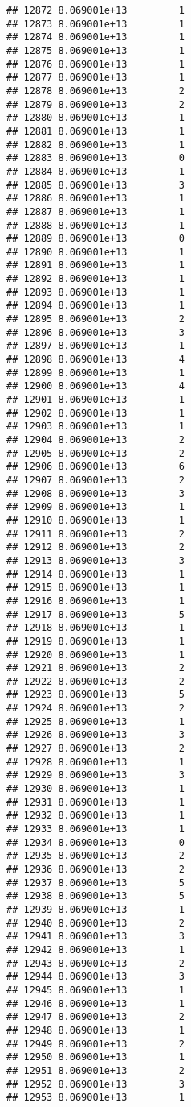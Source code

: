 \documentclass[
]{article}
\begin{document}
\begin{verbatim}
## 12872 8.069001e+13         1
## 12873 8.069001e+13         1
## 12874 8.069001e+13         1
## 12875 8.069001e+13         1
## 12876 8.069001e+13         1
## 12877 8.069001e+13         1
## 12878 8.069001e+13         2
## 12879 8.069001e+13         2
## 12880 8.069001e+13         1
## 12881 8.069001e+13         1
## 12882 8.069001e+13         1
## 12883 8.069001e+13         0
## 12884 8.069001e+13         1
## 12885 8.069001e+13         3
## 12886 8.069001e+13         1
## 12887 8.069001e+13         1
## 12888 8.069001e+13         1
## 12889 8.069001e+13         0
## 12890 8.069001e+13         1
## 12891 8.069001e+13         1
## 12892 8.069001e+13         1
## 12893 8.069001e+13         1
## 12894 8.069001e+13         1
## 12895 8.069001e+13         2
## 12896 8.069001e+13         3
## 12897 8.069001e+13         1
## 12898 8.069001e+13         4
## 12899 8.069001e+13         1
## 12900 8.069001e+13         4
## 12901 8.069001e+13         1
## 12902 8.069001e+13         1
## 12903 8.069001e+13         1
## 12904 8.069001e+13         2
## 12905 8.069001e+13         2
## 12906 8.069001e+13         6
## 12907 8.069001e+13         2
## 12908 8.069001e+13         3
## 12909 8.069001e+13         1
## 12910 8.069001e+13         1
## 12911 8.069001e+13         2
## 12912 8.069001e+13         2
## 12913 8.069001e+13         3
## 12914 8.069001e+13         1
## 12915 8.069001e+13         1
## 12916 8.069001e+13         1
## 12917 8.069001e+13         5
## 12918 8.069001e+13         1
## 12919 8.069001e+13         1
## 12920 8.069001e+13         1
## 12921 8.069001e+13         2
## 12922 8.069001e+13         2
## 12923 8.069001e+13         5
## 12924 8.069001e+13         2
## 12925 8.069001e+13         1
## 12926 8.069001e+13         3
## 12927 8.069001e+13         2
## 12928 8.069001e+13         1
## 12929 8.069001e+13         3
## 12930 8.069001e+13         1
## 12931 8.069001e+13         1
## 12932 8.069001e+13         1
## 12933 8.069001e+13         1
## 12934 8.069001e+13         0
## 12935 8.069001e+13         2
## 12936 8.069001e+13         2
## 12937 8.069001e+13         5
## 12938 8.069001e+13         5
## 12939 8.069001e+13         1
## 12940 8.069001e+13         2
## 12941 8.069001e+13         3
## 12942 8.069001e+13         1
## 12943 8.069001e+13         2
## 12944 8.069001e+13         3
## 12945 8.069001e+13         1
## 12946 8.069001e+13         1
## 12947 8.069001e+13         2
## 12948 8.069001e+13         1
## 12949 8.069001e+13         2
## 12950 8.069001e+13         1
## 12951 8.069001e+13         2
## 12952 8.069001e+13         3
## 12953 8.069001e+13         1

\end{verbatim}
\end{document}
